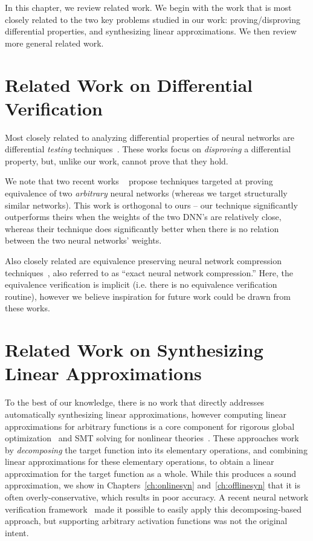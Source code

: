 In this chapter, we review related work. We begin with the work that is most
closely related to the two key problems studied in our work: proving/disproving
differential properties, and synthesizing linear approximations. We then review
more general related work.

\section{Related Work on Differential Verification}
Most closely related to analyzing differential properties of neural networks are
differential \textit{testing} techniques~\cite{xie2019diffchaser, PeiCYJ17,
MaLLZG18, asyrofi2021can}. These works focus on \textit{disproving} a differential
property, but, unlike our work, cannot prove that they hold.

We note that two recent works ~\cite{teuber2021geometric,kleine2020verifying}
propose techniques targeted at proving equivalence of two \textit{arbitrary}
neural
networks (whereas we target structurally similar networks). This work is
orthogonal to ours -- our technique significantly outperforms theirs when the
weights of the two DNN's are relatively close, whereas their technique does
significantly better when there is no relation between the two neural networks'
weights.

Also closely related are equivalence preserving neural network compression
techniques~\cite{lahav2021pruning,serra2021scaling}, also referred to as ``exact
neural network compression.'' Here, the equivalence verification is implicit (i.e.
there is no equivalence verification routine), however we believe inspiration for
future work could be drawn from these works.


\section{Related Work on Synthesizing Linear Approximations}
To the best of our knowledge, there is no work that directly addresses
automatically synthesizing linear approximations, however computing linear
approximations for arbitrary functions is a core component for rigorous global
optimization~\cite{chabert2009contractor} and SMT solving for nonlinear
theories~\cite{gao2013dreal}. These approaches work by \textit{decomposing} the
target function into its elementary operations, and combining linear
approximations for these elementary operations, to obtain a linear approximation
for the target function as a whole. While this produces a sound approximation, we
show in Chapters~\ref{ch:onlinesyn} and~\ref{ch:offlinesyn} that it is often
overly-conservative, which results in poor accuracy. A recent neural network
verification framework~\cite{autolipra} made it possible to easily apply this
decomposing-based approach, but supporting arbitrary activation functions was not
the original intent.

